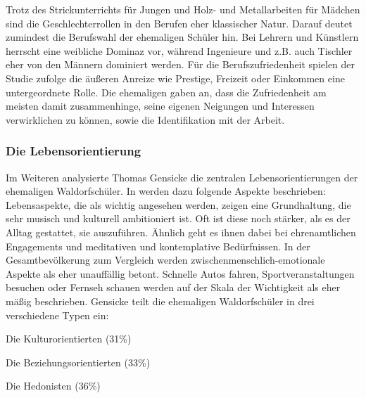 Trotz des Strickunterrichts für Jungen und Holz- und Metallarbeiten für Mädchen sind die Geschlechterrollen in den Berufen eher klassischer Natur. 
Darauf deutet zumindest die Berufswahl der ehemaligen Schüler hin. 
Bei Lehrern und Künstlern herrscht eine weibliche Dominaz vor, während Ingenieure und z.B. auch Tischler eher von den Männern dominiert werden. 
Für die Berufszufriedenheit spielen der Studie zufolge die äußeren Anreize wie Prestige, Freizeit oder Einkommen eine untergeordnete Rolle. 
Die ehemaligen gaben an, dass die Zufriedenheit am meisten damit zusammenhinge, seine eigenen Neigungen und Interessen verwirklichen zu können, sowie die Identifikation mit der Arbeit. 

\subsubsection{Die Lebensorientierung}
\label{subsub:lebensorientierung}

Im Weiteren analysierte Thomas Gensicke die zentralen Lebensorientierungen der ehemaligen Waldorfschüler. 
In \citet[][S. 17ff]{randoll07} werden dazu folgende Aspekte beschrieben: Lebensaspekte, die als wichtig angesehen werden, zeigen eine Grundhaltung, die sehr musisch und kulturell ambitioniert ist. 
Oft ist diese noch stärker, als es der Alltag gestattet, sie auszuführen. 
Ähnlich geht es ihnen dabei bei ehrenamtlichen Engagements und meditativen und kontemplative Bedürfnissen. 
In der Gesamtbevölkerung zum Vergleich werden zwischenmenschlich-emotionale Aspekte als eher unauffällig betont. 
Schnelle Autos fahren, Sportveranstaltungen besuchen oder Fernseh schauen werden auf der Skala der Wichtigkeit als eher mäßig  beschrieben. 
Gensicke teilt die ehemaligen Waldorfschüler in drei verschiedene Typen ein: 
	\begin{compactitem}
		\item Die Kulturorientierten (31\%)
		\item Die Beziehungsorientierten (33\%)
		\item Die Hedonisten (36\%)
	\end{compactitem}

